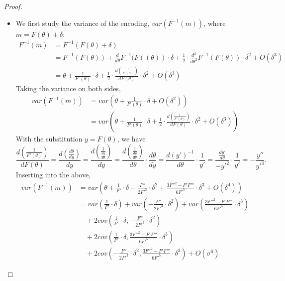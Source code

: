 \begin{proof}
\begin{itemize}
    \item We first study the variance of the encoding, {$var(F^{-1}(m))$}, where $m = F(\theta)  + \delta$:
    \begin{align*}
    F^{-1}(m) &= F^{-1}(F(\theta) + \delta)\\
                &= F^{-1}(F(\theta)) + \frac{d}{d\theta} F^{-1}(F((\theta)) \cdot \delta + \frac{1}{2} \cdot \frac{d^2}{d\theta^2} F^{-1}(F(\theta)) \cdot \delta^2 + O(\delta^3)\\
                &= \theta + \frac{1}{F'(\theta)} \cdot \delta + \frac{1}{2} \cdot \frac{d(\frac{1}{F'(\theta)})}{d F(\theta)} \cdot \delta^2 + O(\delta^3)
                \end{align*}
Taking the variance on both sides,
\begin{align*}                
    var(F^{-1}(m)) &= var(\theta + \frac{1}{F'(\theta)} \cdot \delta + O(\delta^2)) \\
                    &= var\left(\theta + \frac{1}{F'(\theta)} \cdot \delta + \frac{1}{2} \cdot \frac{d(\frac{1}{F'(\theta)})}{d F(\theta)} \cdot \delta^2 + O(\delta^3)\right)
\end{align*}
With the substitution $y = F(\theta)$, we have
\begin{equation*}\frac{d(\frac{1}{F'(\theta)})}{d F(\theta)} = \frac{d(\frac{d\theta}{dy})}{dy} = \frac{d(\frac{1}{\frac{dy}{d\theta}})}{dy} = \frac{d(\frac{1}{\frac{dy}{d\theta}})}{d\theta} \cdot \frac{d\theta}{dy} = \frac{d(y')^{-1}}{d\theta} \cdot \frac{1}{y'} = \frac{\frac{dy'}{d\theta}}{-y'^2} \cdot \frac{1}{y'} = -\frac{y''}{y'^3}.
\end{equation*}
Inserting into the above,
\begin{align*}
    var(F^{-1}(m)) &= var\left(\theta + \frac{1}{F'} \cdot \delta - \frac{F''}{2F'^3} \cdot \delta^2 + \frac{3F''^2 - F'F'''}{6F'^5} \cdot \delta^3 + O(\delta^4)\right)\\
    &= var\left(\frac{1}{F'} \cdot \delta\right) + var\left(-\frac{F''}{2F'^3} \cdot \delta^2\right) + var\left(\frac{3F''^2 - F'F'''}{6F'^5} \cdot \delta^3\right)\\
    &\quad + 2cov\left(\frac{1}{F'} \cdot \delta, -\frac{F''}{2F'^3} \cdot \delta^2\right) \\
    &\quad + 2cov\left(\frac{1}{F'} \cdot \delta, \frac{3F''^2 - F'F'''}{6F'^5} \cdot \delta^3\right) \\
    &\quad + 2cov\left(-\frac{F''}{2F'^3} \cdot \delta^2, \frac{3F''^2 - F'F'''}{6F'^5} \cdot \delta^3\right) + O(\sigma^6)

\end{align*}
\end{itemize}
\end{proof}
